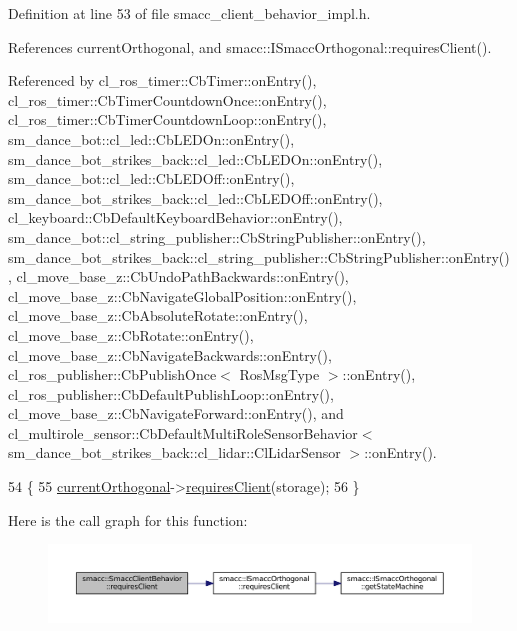 Definition at line 53 of file smacc\+\_\+client\+\_\+behavior\+\_\+impl.\+h.



References current\+Orthogonal, and smacc\+::\+I\+Smacc\+Orthogonal\+::requires\+Client().



Referenced by cl\+\_\+ros\+\_\+timer\+::\+Cb\+Timer\+::on\+Entry(), cl\+\_\+ros\+\_\+timer\+::\+Cb\+Timer\+Countdown\+Once\+::on\+Entry(), cl\+\_\+ros\+\_\+timer\+::\+Cb\+Timer\+Countdown\+Loop\+::on\+Entry(), sm\+\_\+dance\+\_\+bot\+::cl\+\_\+led\+::\+Cb\+L\+E\+D\+On\+::on\+Entry(), sm\+\_\+dance\+\_\+bot\+\_\+strikes\+\_\+back\+::cl\+\_\+led\+::\+Cb\+L\+E\+D\+On\+::on\+Entry(), sm\+\_\+dance\+\_\+bot\+::cl\+\_\+led\+::\+Cb\+L\+E\+D\+Off\+::on\+Entry(), sm\+\_\+dance\+\_\+bot\+\_\+strikes\+\_\+back\+::cl\+\_\+led\+::\+Cb\+L\+E\+D\+Off\+::on\+Entry(), cl\+\_\+keyboard\+::\+Cb\+Default\+Keyboard\+Behavior\+::on\+Entry(), sm\+\_\+dance\+\_\+bot\+::cl\+\_\+string\+\_\+publisher\+::\+Cb\+String\+Publisher\+::on\+Entry(), sm\+\_\+dance\+\_\+bot\+\_\+strikes\+\_\+back\+::cl\+\_\+string\+\_\+publisher\+::\+Cb\+String\+Publisher\+::on\+Entry(), cl\+\_\+move\+\_\+base\+\_\+z\+::\+Cb\+Undo\+Path\+Backwards\+::on\+Entry(), cl\+\_\+move\+\_\+base\+\_\+z\+::\+Cb\+Navigate\+Global\+Position\+::on\+Entry(), cl\+\_\+move\+\_\+base\+\_\+z\+::\+Cb\+Absolute\+Rotate\+::on\+Entry(), cl\+\_\+move\+\_\+base\+\_\+z\+::\+Cb\+Rotate\+::on\+Entry(), cl\+\_\+move\+\_\+base\+\_\+z\+::\+Cb\+Navigate\+Backwards\+::on\+Entry(), cl\+\_\+ros\+\_\+publisher\+::\+Cb\+Publish\+Once$<$ Ros\+Msg\+Type $>$\+::on\+Entry(), cl\+\_\+ros\+\_\+publisher\+::\+Cb\+Default\+Publish\+Loop\+::on\+Entry(), cl\+\_\+move\+\_\+base\+\_\+z\+::\+Cb\+Navigate\+Forward\+::on\+Entry(), and cl\+\_\+multirole\+\_\+sensor\+::\+Cb\+Default\+Multi\+Role\+Sensor\+Behavior$<$ sm\+\_\+dance\+\_\+bot\+\_\+strikes\+\_\+back\+::cl\+\_\+lidar\+::\+Cl\+Lidar\+Sensor $>$\+::on\+Entry().


\begin{DoxyCode}
54 \{
55     \hyperlink{classsmacc_1_1SmaccClientBehavior_a37e6a2fe61c3a72ed2f3e4180f552089}{currentOrthogonal}->\hyperlink{classsmacc_1_1ISmaccOrthogonal_a602e16b09f8a1b3de889f2f3d90a3211}{requiresClient}(storage);
56 \}
\end{DoxyCode}


Here is the call graph for this function\+:
\nopagebreak
\begin{figure}[H]
\begin{center}
\leavevmode
\includegraphics[width=350pt]{classsmacc_1_1SmaccClientBehavior_a917f001e763a1059af337bf4e164f542_cgraph}
\end{center}
\end{figure}




